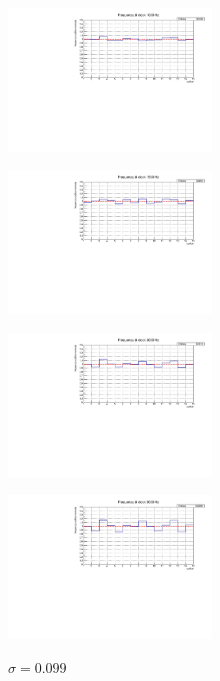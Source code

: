 \documentclass[journal]{IEEEtran}
\begin{document}
\begin{figure}[H]%
\begin{center}

\caption{$\sigma = 0.030$}
\includegraphics[width=0.48\textwidth]{analysis/output/dnl_4_1000hz_bars.pdf}
\label{fig:graph_dnl_1000_hz}

\caption{$\sigma = 0.043$}
\includegraphics[width=0.48\textwidth]{analysis/output/dnl_5_1500hz_bars.pdf}
\label{fig:graph_dnl_1500_hz}
\caption{$\sigma = 0.063$}
\includegraphics[width=0.48\textwidth]{analysis/output/dnl_6_3000hz_bars.pdf}
\label{fig:graph_dnl_3000_hz}
\caption{$\sigma = 0.099$}
\includegraphics[width=0.48\textwidth]{analysis/output/dnl_7_5000hz_bars.pdf}
\label{fig:graph_dnl_5000_hz}
\end{center}
\end{figure}
\end{document}
